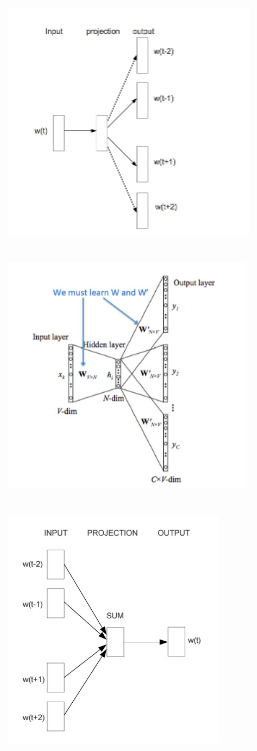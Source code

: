 \documentclass[xetex,mathserif,serif,aspectratio=169]{beamer}
\begin{document}
\begin{frame}[fragile] \frametitle{} \oldB \small

\begin{center}
\includegraphics[height=6cm]{img/skipGram.jpg}
\end{center}

\end{frame}

\begin{frame}[fragile] \frametitle{} \oldB \small

\begin{center}
\includegraphics[height=6cm]{img/skipGram2.jpg}
\end{center}

\end{frame}


\begin{frame}[fragile] \frametitle{} \oldB \small

\begin{center}
\includegraphics[height=6cm]{img/continuousBagOfWords.jpg}
\end{center}

\end{frame}
\end{document}
